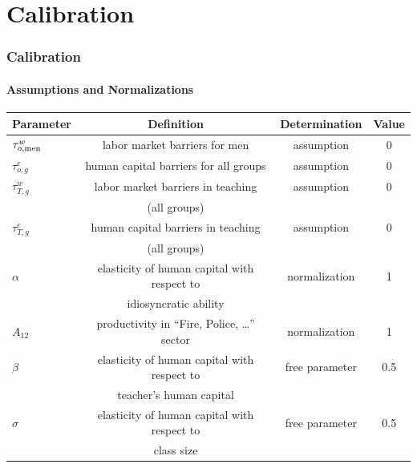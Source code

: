 \documentclass[11pt]{beamer}
\begin{document}
\section{Calibration}	
\begin{frame}
\frametitle{Calibration}
\framesubtitle{Assumptions and Normalizations}
  \tiny
	
	\begin{table}[h!]
		\centering
		\begin{tabular}{lccc}
			\toprule
			Parameter & Definition & Determination & Value\\
			\midrule
			$\tau^{w}_{o,{\rm men}}$ & labor market barriers for men & assumption & 0 \\
			$\tau^{e}_{o,g}$ & human capital barriers for all groups & assumption & 0 \\
			$\tau^{w}_{T,g}$ & labor market barriers in teaching  & assumption & 0 \\
			& (all groups)&\\
			$\tau^{e}_{T,g}$ & human capital barriers in teaching & assumption & 0 \\
			& (all groups) & \\
			$\alpha$ & elasticity of human capital with respect to & normalization & 1 \\
			& idiosyncratic ability & \\
            $A_{12}$ & productivity in ``Fire, Police, \ldots'' sector & normalization & 1 \\
   \midrule
   			$\beta$ & elasticity of human capital with respect to & free parameter & 0.5\\
    & teacher's human capital & \\
            $\sigma$ & elasticity of human capital with respect to & free parameter & 0.5 \\
            & class size & \\
			\bottomrule
		\end{tabular}
		\label{tab:assump}
	\end{table}
\end{frame}
\end{document}
